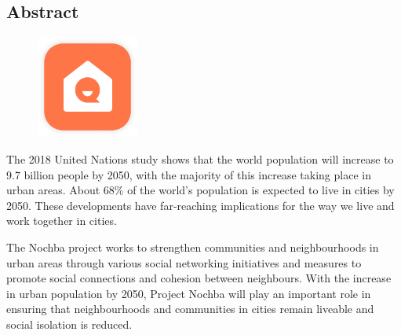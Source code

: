 \begin{spacing}{1}
    \chapter*{Abstract}
\end{spacing}
\begin{figure}
    \begin{center}
      \includegraphics[width=0.3\textwidth]{pics/app-logo.png}
    \end{center}
\end{figure}
The 2018 United Nations study \cite{un2018world} shows that the world population will increase to 9.7 billion people by 2050, with the majority of this increase taking place in urban areas. About 68\% of the world's population is expected to live in cities by 2050. These developments have far-reaching implications for the way we live and work together in cities.

The Nochba project works to strengthen communities and neighbourhoods in urban areas through various social networking initiatives and measures to promote social connections and cohesion between neighbours. With the increase in urban population by 2050, Project Nochba will play an important role in ensuring that neighbourhoods and communities in cities remain liveable and social isolation is reduced.

